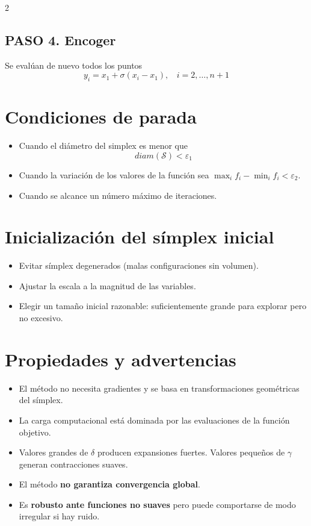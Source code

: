 \documentclass[a4paper, 9pt]{article}
\begin{document}
\begin{multicols}{2}
            \subsection*{PASO 4. Encoger}
            
            Se evalúan de nuevo todos los puntos  \[y_i = x_1 + \sigma(x_i - x_1),~~~~i = 2,\ldots,n+1\]
        
        
        \section{Condiciones de parada}
        
        \begin{itemize}
            \item Cuando el diámetro del simplex es menor que \[diam(\mathcal{S})<\varepsilon_1\]
            \item Cuando la variación de los valores de la función sea \(\max_i f_i - \min_i f_i < \varepsilon_2\).
            \item Cuando se alcance un número máximo de iteraciones.
        \end{itemize}
        
        
        \section{Inicialización del símplex inicial}
        
        \begin{itemize}
            \item Evitar símplex degenerados (malas configuraciones sin volumen).
            \item Ajustar la escala a la magnitud de las variables.
            \item Elegir un tamaño inicial razonable: suficientemente grande para explorar pero no excesivo.
        \end{itemize}
        
        
        \section{Propiedades y advertencias}
        
        \begin{itemize}
            \item El método no necesita gradientes y se basa en transformaciones geométricas del símplex.
            \item La carga computacional está dominada por las evaluaciones de la función objetivo.
            \item Valores grandes de $\delta$ producen expansiones fuertes. Valores pequeños de $\gamma$ generan contracciones suaves.
            \item El método \textbf{no garantiza convergencia global}.
            \item Es \textbf{robusto ante funciones no suaves} pero puede comportarse de modo irregular si hay ruido.
        \end{itemize}
        

\end{multicols}
\end{document}
